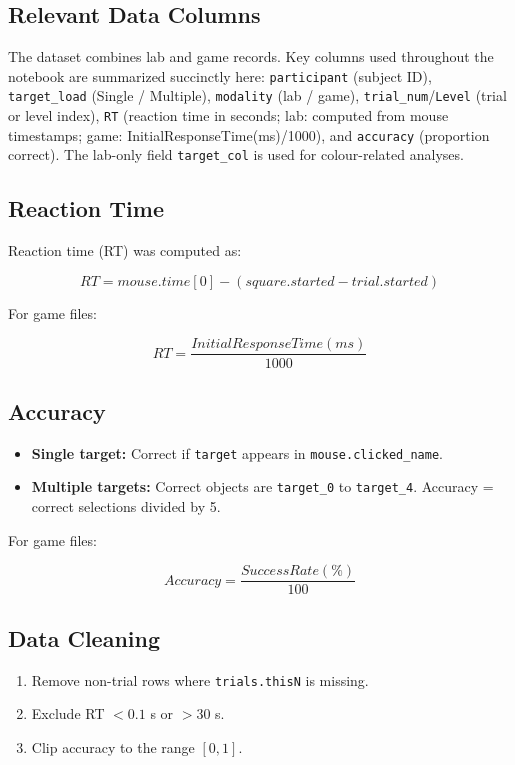 \documentclass[12pt]{article}
\begin{document}
\subsection{Relevant Data Columns}
The dataset combines lab and game records. Key columns used throughout the notebook are summarized succinctly here: \texttt{participant} (subject ID), \texttt{target\_load} (Single / Multiple), \texttt{modality} (lab / game), \texttt{trial\_num}/\texttt{Level} (trial or level index), \texttt{RT} (reaction time in seconds; lab: computed from mouse timestamps; game: InitialResponseTime(ms)/1000), and \texttt{accuracy} (proportion correct). The lab-only field \texttt{target\_col} is used for colour-related analyses.

\subsection{Reaction Time}

Reaction time (RT) was computed as:

\[
RT = mouse.time[0] - (square.started - trial.started)
\]

For game files:

\[
RT = \frac{InitialResponseTime(ms)}{1000}
\]

\subsection{Accuracy}

\begin{itemize}
\item \textbf{Single target:} Correct if \texttt{target} appears in \texttt{mouse.clicked\_name}.
\item \textbf{Multiple targets:} Correct objects are \texttt{target\_0} to \texttt{target\_4}.
Accuracy = correct selections divided by 5.
\end{itemize}

For game files:

\[
Accuracy = \frac{SuccessRate(\%)}{100}
\]

\subsection{Data Cleaning}

\begin{enumerate}
\item Remove non-trial rows where \texttt{trials.thisN} is missing.
\item Exclude RT $<0.1$ s or $>30$ s.
\item Clip accuracy to the range $[0,1]$.
\end{enumerate}
\end{document}

